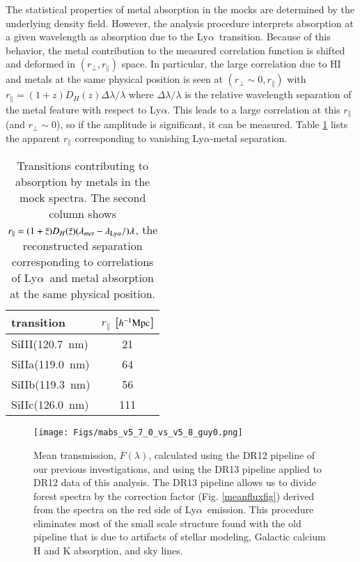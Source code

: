 \documentclass{aa}
\newcommand{\lamlya}{\lambda_{\rm Ly\alpha}}
\newcommand{\hMpc}{h^{-1}{\rm Mpc}}
\newcommand{\lya}{Ly$\alpha$}
\newcommand{\Lya}{Ly$\alpha$~}
\newcommand{\DHub}{D_H}
\newcommand{\rperp}{r_\perp}
\newcommand{\rpar}{r_\parallel}
\begin{document}
The statistical properties of metal absorption in the mocks are determined
by the underlying density field. 
However, the analysis
procedure interprets absorption at a given wavelength as 
absorption due to the \Lya transition.
Because of this behavior, the metal contribution to
the measured correlation function is shifted and deformed in $(\rperp,\rpar)$
space. 
In particular, the large correlation due to HI and metals
at the same physical position is seen at  $(\rperp\sim0,\rpar)$
with 
$\rpar=(1+z)\DHub(z)\Delta\lambda/\lambda$ where $\Delta\lambda/\lambda$
is the relative wavelength separation of the metal feature with respect to \lya.
This leads to a large correlation at this $\rpar$ (and $\rperp\sim0$), 
so if the amplitude is significant, it can be measured.
Table \ref{metaltable} lists
the apparent $\rpar$ corresponding to vanishing \lya-metal separation.



\begin{table}
\centering
\caption{
Transitions contributing to absorption by metals in the mock spectra.
The second column shows
$\rpar= (1+\bar{z})\DHub(\bar{z})(\lambda_{met}-\lamlya/)\lambda$,
the reconstructed separation
corresponding to 
correlations of \Lya and metal absorption at the same
physical position. 
} 
\label{metaltable}
\begin{tabular}{l c   }
  transition &  $\rpar$ [$\hMpc$]\\
\hline \hline
\noalign{\smallskip}
SiIII(120.7~nm)  & 21    \\
SiIIa(119.0~nm)  &  64   \\
SiIIb(119.3~nm)  & 56    \\
SiIIc(126.0~nm)  & 111    \\
\end{tabular}
\end{table}%




\begin{figure}[tb]
\begin{center}
\texttt{[image: Figs/mabs\_v5\_7\_0\_vs\_v5\_8\_guy0.png]}
\caption{
  Mean transmission, $\overline{F}(\lambda)$, calculated
  using the DR12 pipeline
  of our previous investigations, and
  using the DR13 pipeline applied to DR12 data of this analysis.  The DR13 pipeline allows
  us to divide forest spectra by the correction factor
  (Fig. \ref{meanfluxfig})
  derived from the
  spectra on the red side of \Lya emission.
  This procedure eliminates most of the small scale structure
  found with the old pipeline that is due to artifacts of stellar
  modeling, Galactic calcium H and K absorption, and sky lines.
}
\label{meantransfig}
\end{center}
\end{figure}
\end{document}
